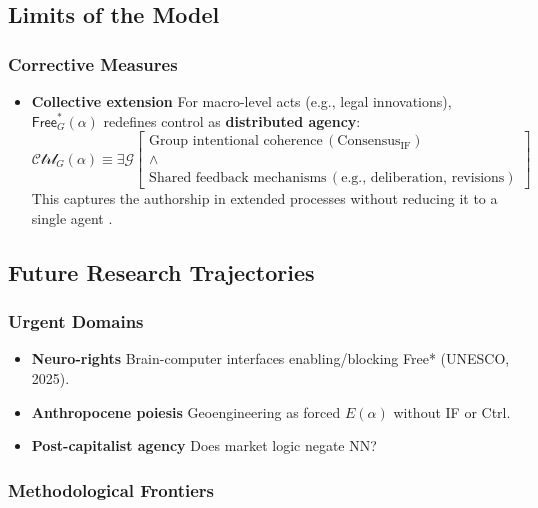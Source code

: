 \documentclass[11pt,a4paper]{article}
\begin{document}
\subsection{Limits of the Model}\label{sec:implications-limits}

\subsubsection{Corrective Measures}

\begin{itemize}
  \item \textbf{Collective extension} For macro-level acts (e.g., legal innovations), \(\mathsf{Free}^{*}_{G}(\alpha)\) redefines control as \textbf{distributed agency}:
  \[
  \mathcal{Ctrl}_{G}(\alpha)\equiv\exists\mathcal{G}\left[\begin{array}{l}\textrm{Group intentional coherence}\,(\textrm{Consensus}_{\textrm{IF}})\\ \wedge\\ \textrm{Shared feedback mechanisms}\,(\textrm{e.g., deliberation, revisions})\end{array}\right]
  \]
  This captures the authorship in extended processes without reducing it to a single agent \cite{list2023}.
\end{itemize}

\subsection{Future Research Trajectories}\label{sec:implications-future}

\subsubsection{Urgent Domains}

\begin{itemize}
  \item \textbf{Neuro-rights} Brain-computer interfaces enabling/blocking Free* (UNESCO, 2025).
  \item \textbf{Anthropocene poiesis} Geoengineering as forced \(E(\alpha)\) without IF or Ctrl.
  \item \textbf{Post-capitalist agency} Does market logic negate NN? \cite{haase2022}
\end{itemize}

\subsubsection{Methodological Frontiers}
\end{document}
